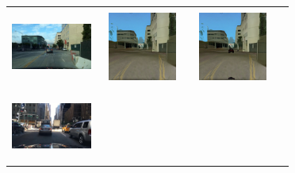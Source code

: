 \documentclass{VUMIFPSbakalaurinis}
\begin{document}
\begin{table}[H]
{\begin{tabular}{|c|c|c|c|}
            \hline
            \\
            \includegraphics[width=100,height=85]{img/original/7ccd7466-426b0001} & 
            \includegraphics[width=100,height=85]{img/mspcv2/7ccd7466-426b0001} & 
            \includegraphics[width=100,height=85]{img/mspccar/7ccd7466-426b0001} \\
            \hline
            \\
            \includegraphics[width=100,height=85]{img/original/7ce33243-6db43a7e} & 

\end{tabular}}
\end{table}
\end{document}
